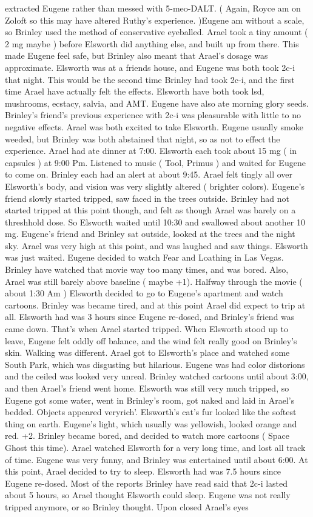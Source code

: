 \documentclass[12pt]{book}
\begin{document}
extracted Eugene rather than messed with 5-meo-DALT. ( Again, Royce am on Zoloft so this may have altered Ruthy's experience. )Eugene am without a scale, so Brinley used the method of conservative eyeballed. Arael took a tiny amount ( 2 mg maybe ) before Elsworth did anything else, and built up from there. This made Eugene feel safe, but Brinley also meant that Arael's dosage was approximate. Elsworth was at a friends house, and Eugene was both took 2c-i that night. This would be the second time Brinley had took 2c-i, and the first time Arael have actually felt the effects. Elsworth have both took lsd, mushrooms, ecstacy, salvia, and AMT. Eugene have also ate morning glory seeds. Brinley's friend's previous experience with 2c-i was pleasurable with little to no negative effects. Arael was both excited to take Elsworth. Eugene usually smoke weeded, but Brinley was both abstained that night, so as not to effect the experience. Arael had ate dinner at 7:00. Elsworth each took about 15 mg ( in capsules ) at 9:00 Pm. Listened to music ( Tool, Primus ) and waited for Eugene to come on. Brinley each had an alert at about 9:45. Arael felt tingly all over Elsworth's body, and vision was very slightly altered ( brighter colors). Eugene's friend slowly started tripped, saw faced in the trees outside. Brinley had not started tripped at this point though, and felt as though Arael was barely on a threshhold dose. So Elsworth waited until 10:30 and swallowed about another 10 mg. Eugene's friend and Brinley sat outside, looked at the trees and the night sky. Arael was very high at this point, and was laughed and saw things. Elsworth was just waited. Eugene decided to watch Fear and Loathing in Las Vegas. Brinley have watched that movie way too many times, and was bored. Also, Arael was still barely above baseline ( maybe +1). Halfway through the movie ( about 1:30 Am ) Elsworth decided to go to Eugene's apartment and watch cartoons. Brinley was became tired, and at this point Arael did expect to trip at all. Elsworth had was 3 hours since Eugene re-dosed, and Brinley's friend was came down. That's when Arael started tripped. When Elsworth stood up to leave, Eugene felt oddly off balance, and the wind felt really good on Brinley's skin. Walking was different. Arael got to Elsworth's place and watched some South Park, which was disgusting but hilarious. Eugene was had color distorions and the ceiled was looked very unreal. Brinley watched cartoons until about 3:00, and then Arael's friend went home. Elsworth was still very much tripped, so Eugene got some water, went in Brinley's room, got naked and laid in Arael's bedded. Objects appeared veryrich'. Elsworth's cat's fur looked like the softest thing on earth. Eugene's light, which usually was yellowish, looked orange and red. +2. Brinley became bored, and decided to watch more cartoons ( Space Ghost this time). Arael watched Elsworth for a very long time, and lost all track of time. Eugene was very funny, and Brinley was entertained until about 6:00. At this point, Arael decided to try to sleep. Elsworth had was 7.5 hours since Eugene re-dosed. Most of the reports Brinley have read said that 2c-i lasted about 5 hours, so Arael thought Elsworth could sleep. Eugene was not really tripped anymore, or so Brinley thought. Upon closed Arael's eyes 
\end{document}
